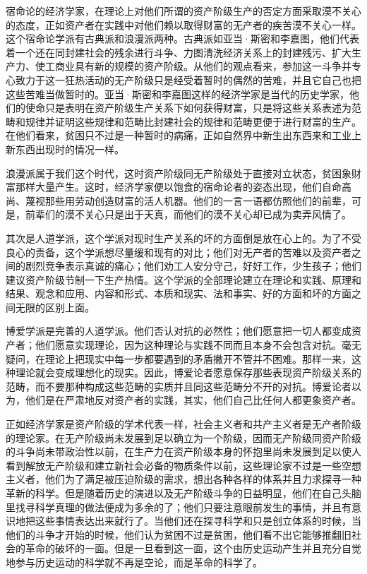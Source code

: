 \documentclass[a4paper,twoside,12pt,AutoFakeBold]{ctexart}
\begin{document}
宿命论的经济学家，在理论上对他们所谓的资产阶级生产的否定方面采取漠不关心的态度，正如资产者在实践中对他们赖以取得财富的无产者的疾苦漠不关心一样。这个宿命论学派有古典派和浪漫派两种。古典派如亚当·斯密和李嘉图，他们代表着一个还在同封建社会的残余进行斗争、力图清洗经济关系上的封建残污、扩大生产力、使工商业具有新的规模的资产阶级。从他们的观点看来，参加这一斗争并专心致力于这一狂热活动的无产阶级只是经受着暂时的偶然的苦难，并且它自己也把这些苦难当做暂时的。亚当·斯密和李嘉图这样的经济学家是当代的历史学家，他们的使命只是表明在资产阶级生产关系下如何获得财富，只是将这些关系表述为范畴和规律并证明这些规律和范畴比封建社会的规律和范畴更便于进行财富的生产。在他们看来，贫困只不过是一种暂时的病痛，正如自然界中新生出东西来和工业上新东西出现时的情况一样。

浪漫派属于我们这个时代，这时资产阶级同无产阶级处于直接对立状态，贫困象财富那样大量产生。这时，经济学家便以饱食的宿命论者的姿态出现，他们自命高尚、蔑视那些用劳动创造财富的活人机器。他们的一言一语都仿照他们的前辈，可是，前辈们的漠不关心只是出于天真，而他们的漠不关心却已成为卖弄风情了。

其次是人道学派，这个学派对现时生产关系的坏的方面倒是放在心上的。为了不受良心的责备，这个学派想尽量缓和现有的对比；他们对无产者的苦难以及资产者之间的剧烈竞争表示真诚的痛心；他们劝工人安分守己，好好工作，少生孩子；他们建议资产阶级节制一下生产热情。这个学派的全部理论建立在理论和实践、原理和结果、观念和应用、内容和形式、本质和现实、法和事实、好的方面和坏的方面之间无限的区别上面。

博爱学派是完善的人道学派。他们否认对抗的必然性；他们愿意把一切人都变成资产者；他们愿意实现理论，因为这种理论与实践不同而且本身不会包含对抗。毫无疑问，在理论上把现实中每一步都要遇到的矛盾撇开不管并不困难。那样一来，这种理论就会变成理想化的现实。因此，博爱论者愿意保存那些表现资产阶级关系的范畴，而不要那种构成这些范畴的实质并且同这些范畴分不开的对抗。博爱论者以为，他们是在严肃地反对资产者的实践，其实，他们自己比任何人都更象资产者。

正如经济学家是资产阶级的学术代表一样，社会主义者和共产主义者是无产者阶级的理论家。在无产阶级尚未发展到足以确立为一个阶级，因而无产阶级同资产阶级的斗争尚未带政治性以前，在生产力在资产阶级本身的怀抱里尚未发展到足以使人看到解放无产阶级和建立新社会必备的物质条件以前，这些理论家不过是一些空想主义者，他们为了满足被压迫阶级的需求，想出各种各样的体系并且力求探寻一种革新的科学。但是随着历史的演进以及无产阶级斗争的日益明显，他们在自己头脑里找寻科学真理的做法便成为多余的了；他们只要注意眼前发生的事情，并且有意识地把这些事情表达出来就行了。当他们还在探寻科学和只是创立体系的时候，当他们的斗争才开始的时候，他们认为贫困不过是贫困，他们看不出它能够推翻旧社会的革命的破坏的一面。但是一旦看到这一面，这个由历史运动产生并且充分自觉地参与历史运动的科学就不再是空论，而是革命的科学了。
\end{document}
